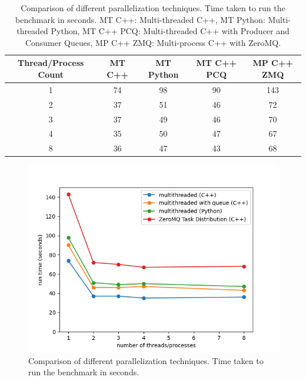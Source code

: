 \begin{spacing}{1.2}
    \begin{table}
        \centering
        \begin{tabular}{|c|c|c|c|c|}
            \hline
            \textbf{Thread/Process Count} & \textbf{MT C++} & \textbf{MT Python} & \textbf{MT C++ PCQ} & \textbf{MP C++ ZMQ} \\
            \hline
            1                     & 74              & 98                 & 90                  & 143                 \\
            2                     & 37              & 51                 & 46                  & 72                  \\
            3                     & 37              & 49                 & 46                  & 70                  \\
            4                     & 35              & 50                 & 47                  & 67                  \\
            8                     & 36              & 47                 & 43                  & 68                  \\
            \hline
        \end{tabular}
        \caption{Comparison of different parallelization techniques. Time taken to run the benchmark in seconds.
            MT C++: Multi-threaded C++, MT Python: Multi-threaded Python, MT C++ PCQ: Multi-threaded C++ with Producer and
            Consumer Queues, MP C++ ZMQ: Multi-process C++ with ZeroMQ.}
        \label{tab:parallelization_comparison}
    \end{table}
    \begin{figure}
        \centering
        \includegraphics[width=\textwidth]{Chapitre4/figures/comp.png}
        \caption{Comparison of different parallelization techniques. Time taken to run the benchmark in seconds.}
        \label{fig:parallelization_comparison}
    \end{figure}


\end{spacing}
